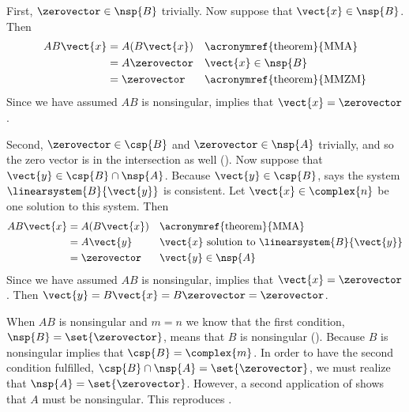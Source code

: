 First, $\zerovector\in\nsp{B}$ trivially.  Now suppose that $\vect{x}\in\nsp{B}$.  Then 
%
\begin{align*}
AB\vect{x}
&=A(B\vect{x})&&\text{\acronymref{theorem}{MMA}}\\
&=A\zerovector&&\vect{x}\in\nsp{B}\\
&=\zerovector&&\text{\acronymref{theorem}{MMZM}}
\end{align*}
%
Since we have assumed $AB$ is nonsingular,  implies that $\vect{x}=\zerovector$.\par
%
Second, $\zerovector\in\csp{B}$ and $\zerovector\in\nsp{A}$ trivially, and so the zero vector is in the intersection as well ().  Now suppose that $\vect{y}\in\csp{B}\cap\nsp{A}$.  Because $\vect{y}\in\csp{B}$,  says the system $\linearsystem{B}{\vect{y}}$ is consistent.  Let $\vect{x}\in\complex{n}$ be one solution to this system.  Then
%
\begin{align*}
AB\vect{x}
&=A(B\vect{x})&&\text{\acronymref{theorem}{MMA}}\\
&=A\vect{y}&&\text{$\vect{x}$ solution to $\linearsystem{B}{\vect{y}}$}\\
&=\zerovector&&\vect{y}\in\nsp{A}
\end{align*}
%
Since we have assumed $AB$ is nonsingular,  implies that $\vect{x}=\zerovector$.  Then $\vect{y}=B\vect{x}=B\zerovector=\zerovector$.\par
%
When $AB$ is nonsingular and $m=n$ we know that the first condition, $\nsp{B}=\set{\zerovector}$, means that $B$ is nonsingular ().  Because $B$ is nonsingular  implies that $\csp{B}=\complex{m}$.  In order to have the second condition fulfilled, $\csp{B}\cap\nsp{A}=\set{\zerovector}$, we must realize that $\nsp{A}=\set{\zerovector}$.  However, a second application of  shows that $A$ must be nonsingular.  This reproduces .
